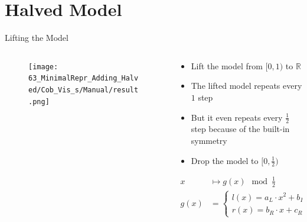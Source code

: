 \section{Halved Model}

\begin{frame}{Lifting the Model}
	\vspace{-1em}
	\begin{columns}
		\begin{column}{.4 \textwidth}
			\begin{figure}
				\texttt{[image: 63\_MinimalRepr\_Adding\_Halved/Cob\_Vis\_s/Manual/result.png]}
			\end{figure}
		\end{column}
		\begin{column}{.5 \textwidth}
			\pause
			\begin{itemize}
				\item Lift the model from $[0, 1)$ to $\mathbb{R}$ \pause
				\item The lifted model repeats every $1$ step \pause
				\item But it even repeats every $\frac{1}{2}$ step because of the built-in symmetry \pause
				\item Drop the model to $[0, \frac{1}{2})$ \pause
			\end{itemize}
			\begin{align*}
				x    & \mapsto g(x) \mod \frac{1}{2}                                            \\
				g(x) & = \begin{cases}
					         l(x) = a_L \cdot x^2 + b_L \cdot x + c_L & \text{ if } x < \frac{1}{4} \\
					         r(x) = b_R \cdot x + c_R                 & \text{ else}
				         \end{cases}
			\end{align*}
		\end{column}
	\end{columns}
\end{frame}


